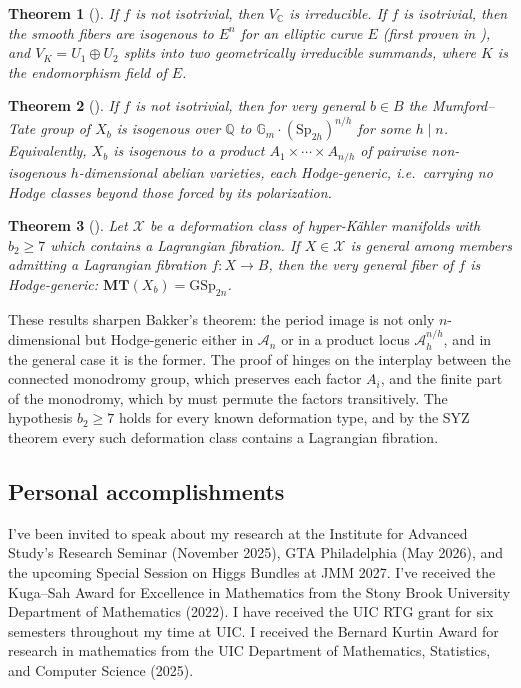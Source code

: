 \documentclass[11pt]{article}
\newcommand{\Q}{\mathbb{Q}}
\newcommand{\C}{\mathbb{C}}
\newcommand{\Gm}{\mathbb{G}_m}
\newcommand{\cA}{\mathcal{A}}
\newcommand{\MT}{\mathbf{MT}}
\newcommand{\Sp}{\mathrm{Sp}}
\newcommand{\GSp}{\mathrm{GSp}}
\theoremstyle{compact}
\newtheorem{theorem}{Theorem}
\begin{document}
\begin{theorem}[\cite{varvak25}]\label{thm:monodromy}
If $f$ is not isotrivial, then $V_\C$ is irreducible. If $f$ is isotrivial, then the smooth
fibers are isogenous to $E^n$ for an elliptic curve $E$ (first proven in
\cite{kim-laza-martin24}), and $V_K=U_1\oplus U_2$ splits into two geometrically irreducible
summands, where $K$ is the endomorphism field of $E$.
\end{theorem}

\begin{theorem}[\cite{varvak26}]\label{thm:mt}
If $f$ is not isotrivial, then for very general $b\in B$ the Mumford--Tate group of $X_b$ is
isogenous over $\Q$ to $\Gm\cdot(\Sp_{2h})^{n/h}$ for some $h\mid n$. Equivalently, $X_b$ is
isogenous to a product $A_1\times\cdots\times A_{n/h}$ of pairwise non-isogenous
$h$-dimensional abelian varieties, each \emph{Hodge-generic}, i.e.\ carrying no Hodge
classes beyond those forced by its polarization.
\end{theorem}

\begin{theorem}[\cite{varvak26}]\label{thm:general}
Let $\mathcal{X}$ be a deformation class of hyper-K\"ahler manifolds with $b_2\ge7$ which
contains a Lagrangian fibration. If $X\in\mathcal{X}$ is general among members admitting a
Lagrangian fibration $f\colon X\to B$, then the very general fiber of $f$ is Hodge-generic:
$\MT(X_b)=\GSp_{2n}$.
\end{theorem}

These results sharpen Bakker's theorem: the period image is not only $n$-dimensional but
Hodge-generic either in $\cA_n$ or in a product locus $\cA_h^{n/h}$, and in the general case
it is the former. The proof of  hinges on the interplay between the connected
monodromy group, which preserves each factor $A_i$, and the finite part of the monodromy,
which by  must permute the factors transitively. The hypothesis
$b_2\ge7$ holds for every known deformation type, and by the SYZ theorem every such
deformation class contains a Lagrangian fibration.

\subsection*{Personal accomplishments}

I've been invited to speak about my research at the Institute for Advanced Study's
Research Seminar (November 2025), GTA Philadelphia (May 2026), and the upcoming 
Special Session on Higgs Bundles at JMM 2027. I've received the Kuga--Sah Award for
Excellence in Mathematics from the Stony Brook University Department of Mathematics (2022). 
I have received the UIC RTG grant for six semesters throughout my time at UIC. 
I received the Bernard Kurtin Award for research in mathematics from the UIC Department of 
Mathematics, Statistics, and Computer Science (2025). 
\end{document}
